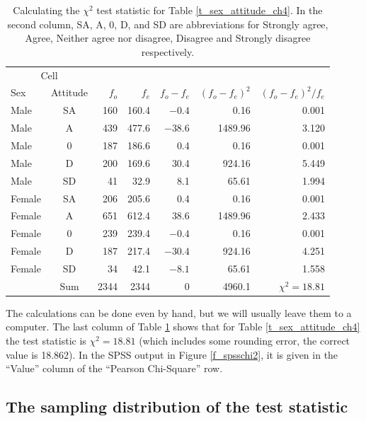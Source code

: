 \begin{table}
\caption{Calculating the $\chi^{2}$ test statistic for Table
\ref{t_sex_attitude_ch4}. In the second column,
SA, A, 0, D, and SD are abbreviations
for Strongly agree, Agree, Neither agree nor disagree, Disagree and
Strongly disagree respectively.}
\label{t_sex_attitude_chi2}
\begin{center}
\begin{tabular}{|lc|rrrrr|}\hline
\multicolumn{2}{|c|}{Cell} & & & & & \\
Sex & Attitude & $f_{o}$ & $f_{e}$ & $f_{o}-f_{e}$ & $(f_{o}-f_{e})^{2}$ &
$(f_{o}-f_{e})^{2}/f_{e}$\\
\hline
Male & SA & 160 & 160.4 & $-0.4$& 0.16& 0.001 \\
Male & A & 439 & 477.6 & $-38.6$ & 1489.96& 3.120 \\
Male & 0 & 187 & 186.6 & 0.4& 0.16& 0.001 \\
Male & D & 200 & 169.6 & 30.4& 924.16& 5.449 \\
Male & SD & 41 & 32.9 & 8.1& 65.61& 1.994 \\[.5ex]
Female & SA & 206 & 205.6 & 0.4& 0.16 & 0.001 \\
Female & A & 651 & 612.4 & 38.6& 1489.96& 2.433 \\
Female & 0 & 239 & 239.4 & $-0.4$& 0.16& 0.001 \\
Female & D & 187 & 217.4 & $-30.4$& 924.16& 4.251 \\
Female & SD & 34 & 42.1 & $-8.1$& 65.61& 1.558 \\
\hline
& Sum & 2344& 2344 & 0 & 4960.1& $\chi^{2}=18.81$ \\
\hline
\end{tabular}
\end{center}
\end{table}

The calculations can be done even by hand, but we will
usually leave them to a computer. The last column of Table
\ref{t_sex_attitude_chi2} shows that for Table \ref{t_sex_attitude_ch4}
the test statistic is $\chi^{2}=18.81$ (which includes some rounding
error, the correct value is 18.862). In the SPSS output in Figure
\ref{f_spsschi2}, it is given in the ``Value'' column of the
``Pearson Chi-Square'' row.


\subsection{The sampling distribution of the test statistic}
\label{ss_tables_chi2test_sdist}

